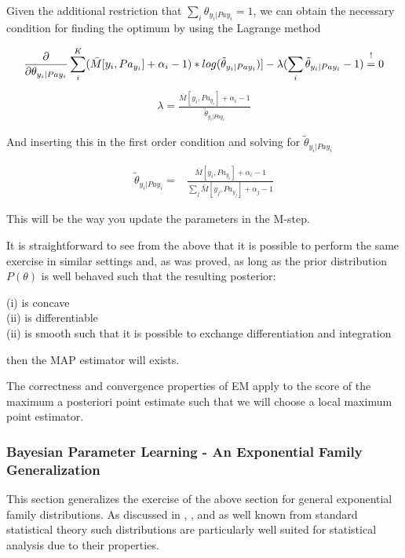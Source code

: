 \documentclass[11pt]{article}
\begin{document}
\begin{article}
Given the additional restriction that \(\sum_i \theta_{y_i |
    Pa{y_i}} = 1\), we can obtain the necessary condition for finding
the optimum by using the Lagrange method

\begin{align} \label{eq:first-order1}
\frac{\partial}{\partial \theta_{y_i | Pa{y_i}}} \sum_i^K (\bar{M}[y_i, Pa_{y_i}] + \alpha_i - 1) * log(\tilde{\theta}_{y_i | Pa{y_i}})] - \lambda (\sum_i \tilde{\theta}_{y_i | Pa{y_i}} - 1) \mathrel{\stackon[5pt]{$=$}{$\scriptstyle!$}} 0
\end{align}
\begin{align} \label{eq:first-order2}
\lambda = \frac{\bar{M}[y_i, Pa_{y_i}] + \alpha_i - 1}{\tilde{\theta}_{y_i | Pa{y_i}}}
\end{align}

And inserting this in the first order condition and solving for
\(\tilde{\theta}_{y_i | Pa{y_i}}\)

\begin{align} \label{eq:solution}
\tilde{\theta}_{y_i | Pa{y_i}} =& \frac{\bar{M}[y_i, Pa_{y_i}] + \alpha_i - 1}{\sum_j \bar{M}[y_j, Pa_{y_j}] + \alpha_j - 1}
\end{align}

This will be the way you update the parameters in the M-step.

It is straightforward to see from the above that it is possible to
perform the same exercise in similar settings and, as was proved,
as long as the prior distribution \(P(\theta)\) is well behaved such
that the resulting posterior:

(i) is concave \\
(ii) is differentiable \\
(ii) is smooth such that it is possible to exchange differentiation and integration

then the MAP estimator will exists.

The correctness and convergence properties of EM apply to the score
of the maximum a posteriori point estimate such that we will choose
a local maximum point estimator.

\subsubsection{Bayesian Parameter Learning - An Exponential Family Generalization}
\label{sec:org222a5df}

This section generalizes the exercise of the above section for
general exponential family distributions. As discussed in
\cite{barndorff1978hyperbolic}, \cite{geiger1998asymptotic},
\cite{lauritzen1996graphical} and as well known from standard
statistical theory such distributions are particularly well suited
for statistical analysis due to their properties. 


\end{article}
\end{document}
